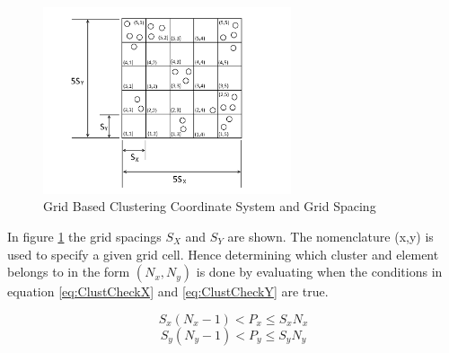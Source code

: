 \begin{figure}[H]
\centering
\includegraphics[width=0.65\textwidth]{Figures/GridClustCoord.png}
\caption{\label{fig:GridClustCoord} Grid Based Clustering Coordinate System and Grid Spacing}
\end{figure}

In figure \ref{fig:GridClustCoord} the grid spacings $S_X$ and $S_Y$ are shown. The nomenclature (x,y) is used to specify a given grid cell. Hence determining which cluster and element belongs to in the form $(N_x,N_y)$ is done by evaluating when the conditions in equation \ref{eq:ClustCheckX} and \ref{eq:ClustCheckY} are true.

\begin{equation}
\label{eq:ClustCheckX}
S_x(N_x-1)<P_x\leqslant S_{x}N_{x}
\end{equation}
\begin{equation}
\label{eq:ClustCheckY}
S_y(N_y-1)<P_y\leqslant S_{y}N_{y}
\end{equation}

